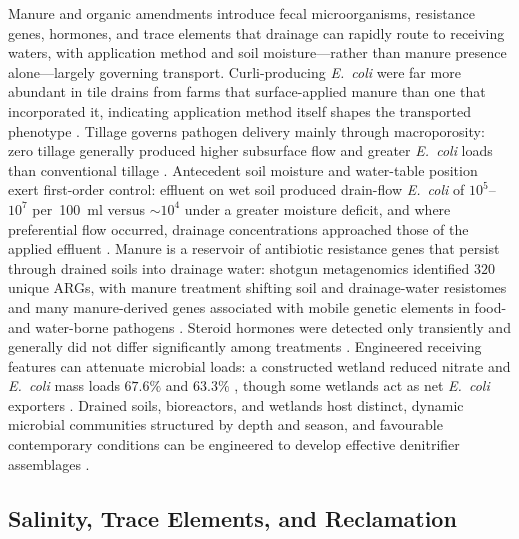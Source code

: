 Manure and organic amendments introduce fecal microorganisms, resistance
genes, hormones, and trace elements that drainage can rapidly route to
receiving waters, with application method and soil moisture---rather than
manure presence alone---largely governing transport. Curli-producing
\textit{E.\ coli} were far more abundant in tile drains from farms that
surface-applied manure than one that incorporated it, indicating application
method itself shapes the transported phenotype \parencite{Truhlar2015}.
Tillage governs pathogen delivery mainly through macroporosity: zero tillage
generally produced higher subsurface flow and greater \textit{E.\ coli} loads
than conventional tillage \parencite{Thiagarajan2007,Jenkins2009}. Antecedent
soil moisture and water-table position exert first-order control: effluent on
wet soil produced drain-flow \textit{E.\ coli} of $10^{5}$--$10^{7}$
per~100~ml versus $\sim10^{4}$ under a greater moisture deficit, and where
preferential flow occurred, drainage concentrations approached those of the
applied effluent \parencite{Collins2007,Ding2021}. Manure is a reservoir of
antibiotic resistance genes that persist through drained soils into drainage
water: shotgun metagenomics identified $320$ unique ARGs, with manure
treatment shifting soil and drainage-water resistomes and many manure-derived
genes associated with mobile genetic elements in food- and water-borne
pathogens \parencite{Smith2019b}. Steroid hormones were detected only
transiently and generally did not differ significantly among treatments
\parencite{Jenkins2009}. Engineered receiving features can attenuate
microbial loads: a constructed wetland reduced nitrate and \textit{E.\ coli}
mass loads $67.6\%$ and $63.3\%$ \parencite{Haverstock2017}, though some
wetlands act as net \textit{E.\ coli} exporters \parencite{Stott2023}. Drained
soils, bioreactors, and wetlands host distinct, dynamic microbial communities
structured by depth and season, and favourable contemporary conditions can be
engineered to develop effective denitrifier assemblages
\parencite{Andrus2014,Porter2015,Hathaway2015,Knorr2023,Schilling2017}.

\subsection{Salinity, Trace Elements, and Reclamation}

